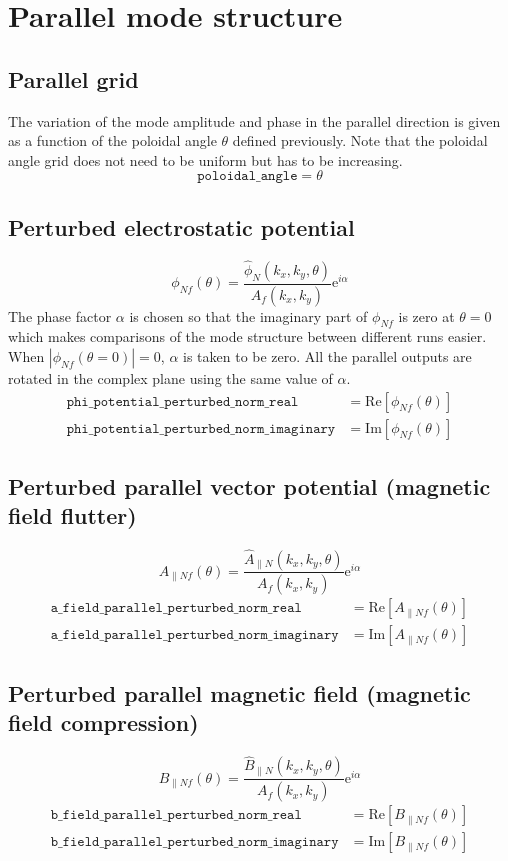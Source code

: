\documentclass[a4paper]{report}
\begin{document}
\section{Parallel mode structure}
\subsection{Parallel grid} \label{sec:polgrid}
The variation of the mode amplitude and phase in the parallel direction is given as a function of the poloidal angle $\theta$ defined previously. Note that the poloidal angle grid does not need to be uniform but has to be increasing.
$$\texttt{poloidal\_angle}=\theta$$ 

\subsection{Perturbed electrostatic potential} \label{sec:eigenmode:phi}
$$\phi_{Nf}(\theta) = \frac{\hat{\phi}_N(k_x,k_y,\theta)}{A_f(k_x,k_y)}\textrm{e}^{i\alpha}$$
The phase factor $\alpha$ is chosen so that the imaginary part of $\phi_{Nf}$ is zero at $\theta=0$ which makes comparisons of the mode structure between different runs easier. When $|\phi_{Nf}(\theta=0)|=0$, $\alpha$ is taken to be zero. All the parallel outputs are rotated in the complex plane using the same value of $\alpha$.
\begin{align*}
\texttt{phi\_potential\_perturbed\_norm\_real}&=\textrm{Re}\left[ \phi_{Nf}(\theta) \right]\\
\texttt{phi\_potential\_perturbed\_norm\_imaginary}&=\textrm{Im}\left[ \phi_{Nf}(\theta) \right]
\end{align*}
 
\subsection{Perturbed parallel vector potential (magnetic field flutter)} \label{sec:eigenmode:apar}
$$A_{\parallel Nf}(\theta) = \frac{\hat{A}_{\parallel N}(k_x,k_y,\theta)}{A_f(k_x,k_y)}\textrm{e}^{i\alpha}$$
\begin{align*}
\texttt{a\_field\_parallel\_perturbed\_norm\_real}&=\textrm{Re}\left[ A_{\parallel Nf}(\theta) \right]\\
\texttt{a\_field\_parallel\_perturbed\_norm\_imaginary}&=\textrm{Im}\left[ A_{\parallel Nf}(\theta) \right]
\end{align*}

\subsection{Perturbed parallel magnetic field (magnetic field compression)} \label{sec:eigenmode:bpar}
$$B_{\parallel Nf}(\theta) = \frac{\hat{B}_{\parallel N}(k_x,k_y,\theta)}{A_f(k_x,k_y)}\textrm{e}^{i\alpha}$$
\begin{align*}
\texttt{b\_field\_parallel\_perturbed\_norm\_real}&=\textrm{Re}\left[ B_{\parallel Nf}(\theta) \right]\\
\texttt{b\_field\_parallel\_perturbed\_norm\_imaginary}&=\textrm{Im}\left[ B_{\parallel Nf}(\theta) \right]
\end{align*}
\end{document}
